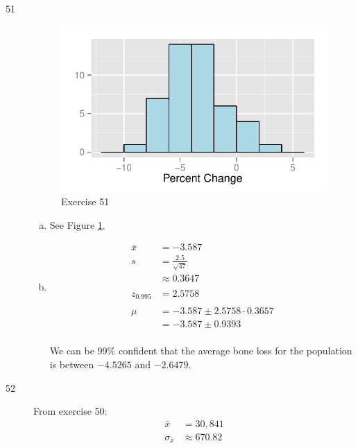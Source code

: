 \documentclass[letterpaper, landscape]{exam}
\begin{document}
\begin{description}
      \item[51]
        \begin{figure}[H]
          \centering
          \includegraphics{ex51.pdf}
          \caption{Exercise 51}
          \label{fig:ex51}
        \end{figure}

        \begin{enumerate}[(a)]
          \item See Figure \ref{fig:ex51}. 

          \item
            \begin{align*}
              \bar{x} & = -3.587 \\
              s       & = \frac{2.5}{\sqrt{47}} \\
                      & \approx 0.3647 \\
              \\
              z_{0.995} & = 2.5758 \\
              \\
              \mu & = -3.587 \pm 2.5758 \cdot 0.3657 \\
                  & = -3.587 \pm 0.9393 \\
            \end{align*}

            We can be 99\% confident that the average bone loss for the
            population is between $-4.5265$ and $-2.6479$.

        \end{enumerate}

      \item[52]
        \begin{enumerate}[(a)]
          From exercise 50:
          \begin{align*}
            \bar{x}          & = 30,841 \\
            \sigma_{\bar{x}} & \approx 670.82 \\
          \end{align*}


\end{enumerate}
\end{description}
\end{document}
